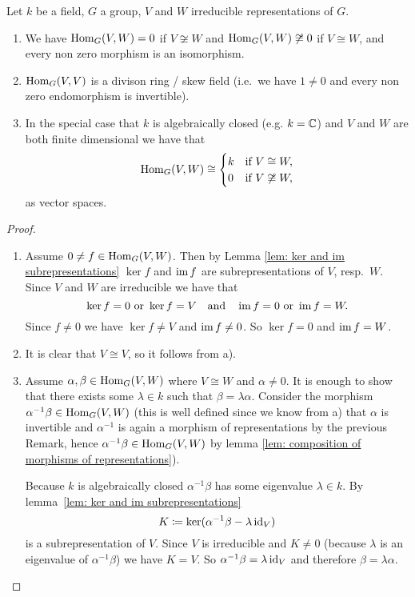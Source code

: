\begin{lem}
  Let $k$ be a field, $G$ a group, $V$ and $W$ irreducible representations of $G$.
  \begin{enumerate}[label=\emph{\alph*)},leftmargin=*]
    \item
      We have $\operatorname{Hom}_G(V,W) = 0$ if $V \not\cong W$ and $\operatorname{Hom}_G(V,W) \not\cong 0$ if $V \cong W$, and every non zero morphism is an isomorphism.
    \item
      $\operatorname{Hom}_G(V,V)$ is a divison ring / skew field (i.e.\ we have $1 \neq 0$ and every non zero endomorphism is invertible).
    \item
      In the special case that $k$ is algebraically closed (e.g. $k = \mathbb{C}$) and $V$ and $W$ are both finite dimensional we have that
      \[
              \operatorname{Hom}_G(V,W)
        \cong \begin{cases}
                k & \text{if } V \cong W,     \\
                0 & \text{if } V \not\cong W,
              \end{cases}
      \]
      as vector spaces.
  \end{enumerate}
\end{lem}
\begin{proof}
  \begin{enumerate}[label=\emph{\alph*)},leftmargin=*]
    \item 
      Assume $0 \neq f \in \operatorname{Hom}_G(V,W)$.
      Then by Lemma \ref{lem: ker and im subrepresentations} $\ker f$ and $\operatorname{im} f$ are subrepresentations of $V$, resp.\ $W$.
      Since $V$ and $W$ are irreducible we have that
      \[
          \ker f = 0
          \text{ or }
          \ker f = V
        \quad
        \text{and}
        \quad
          \operatorname{im} f = 0
          \text{ or }
          \operatorname{im} f = W.
      \]
      Since $f \neq 0$ we have $\ker f \neq V$ and $\operatorname{im} f \neq 0$.
      So $\ker f = 0$ and $\operatorname{im} f = W$.
    \item
      It is clear that $V \cong V$, so it follows from a).
    \item
      Assume $\alpha, \beta \in \operatorname{Hom}_G(V,W)$ where $V \cong W$ and $\alpha \neq 0$.
      It is enough to show that there exists some $\lambda \in k$ such that $\beta = \lambda \alpha$.
      Consider the morphism $\alpha^{-1} \beta \in \operatorname{Hom}_G(V,W)$ (this is well defined since we know from a) that $\alpha$ is invertible and $\alpha^{-1}$ is again a morphism of representations by the previous Remark, hence $\alpha^{-1} \beta \in \operatorname{Hom}_G(V,W)$ by lemma \ref{lem: composition of morphisms of representations}).
      
      Because $k$ is algebraically closed $\alpha^{-1} \beta$ has some eigenvalue $\lambda \in k$.
      By \mbox{lemma \ref{lem: ker and im subrepresentations}}
      \[
                  K
        \coloneqq \ker(\alpha^{-1} \beta - \lambda \operatorname{id}_V)
      \]
      is a subrepresentation of $V$.
      Since $V$ is irreducible and $K \neq 0$ (because $\lambda$ is an eigenvalue of $\alpha^{-1} \beta$) we have $K = V$.
      So $\alpha^{-1} \beta = \lambda \operatorname{id}_V$ and therefore $\beta = \lambda \alpha$.
    \qedhere
  \end{enumerate}
\end{proof}


